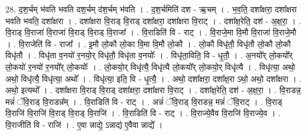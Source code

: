 \documentclass[17pt]{extarticle}
\begin{document}
28. द॒श॒र्चम् भ॑वति भवति दश॒र्चम् द॑श॒र्चम् भ॑वति । . द॒श॒र्चमिति॑ दश - ऋ॒चम् । . भ॒व॒ति॒ दशा᳚क्षरा॒ दशा᳚क्षरा भवति भवति॒ दशा᳚क्षरा । . दशा᳚क्षरा वि॒राड् वि॒राड् दशा᳚क्षरा॒ दशा᳚क्षरा वि॒राट् । . दशा᳚क्ष॒रेति॒ दश॑ - अ॒क्ष॒रा॒ । . वि॒राड् वि॒राजा॑ वि॒राजा॑ वि॒राड् वि॒राड् वि॒राजा᳚ । . वि॒राडिति॑ वि - राट् । . वि॒राजे॒मा वि॒मौ वि॒राजा॑ वि॒राजे॒मौ । . वि॒राजेति॑ वि - राजा᳚ । . इ॒मौ लो॒कौ लो॒का वि॒मा वि॒मौ लो॒कौ । . लो॒कौ विधृ॑तौ॒ विधृ॑तौ लो॒कौ लो॒कौ विधृ॑तौ । . विधृ॑ता व॒नयो॑ र॒नयो॒र् विधृ॑तौ॒ विधृ॑ता व॒नयोः᳚ । . विधृ॑ता॒विति॒ वि - धृ॒तौ॒ । . अ॒नयो᳚र् लो॒कयो᳚र् लो॒कयो॑ र॒नयो॑ र॒नयो᳚र् लो॒कयोः᳚ । . लो॒कयो॒र् विधृ॑त्यै॒ विधृ॑त्यै लो॒कयो᳚र् लो॒कयो॒र् विधृ॑त्यै । . विधृ॑त्या॒ अथो॒ अथो॒ विधृ॑त्यै॒ विधृ॑त्या॒ अथो᳚ । . विधृ॑त्या॒ इति॒ वि - धृ॒त्यै॒ । . अथो॒ दशा᳚क्षरा॒ दशा᳚क्ष॒रा ऽथो॒ अथो॒ दशा᳚क्षरा । . अथो॒ इत्यथो᳚ । . दशा᳚क्षरा वि॒राड् वि॒राड् दशा᳚क्षरा॒ दशा᳚क्षरा वि॒राट् । . दशा᳚क्ष॒रेति॒ दश॑ - अ॒क्ष॒रा॒ । . वि॒राडन्न॒ मन्नं॑ ॅवि॒राड् वि॒राडन्न᳚म् । . वि॒राडिति॑ वि - राट् । . अन्नं॑ ॅवि॒राड् वि॒राडन्न॒ मन्नं॑ ॅवि॒राट् । . वि॒राड् वि॒राजि॑ वि॒राजि॑ वि॒राड् वि॒राड् वि॒राजि॑ । . वि॒राडिति॑ वि - राट् । . वि॒राज्ये॒वैव वि॒राजि॑ वि॒राज्ये॒व । . वि॒राजीति॑ वि - राजि॑ । . ए॒वा न्नाद्ये॒ ऽन्नाद्य॑ ए॒वैवा न्नाद्ये᳚ । \newline
\end{document}

